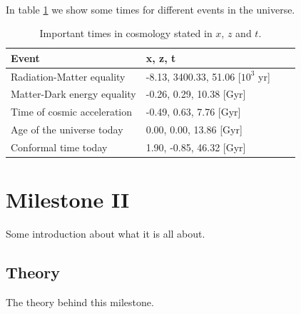 \documentclass{aa}
\begin{document}
\noindent
\\
In table \ref{tab:M1_times} we show some times for different events in the universe.
\begin{table}[h!] %
     \caption{Important times in cosmology stated in $x$, $z$ and $t$.} %
     \label{tab:M1_times}
     \begin{tabular}{l|l|r|l} %
       \textbf{Event} & \textbf{x, z, t}\\ %
       \hline %
       Radiation-Matter equality & -8.13,  3400.33, 51.06 [$10^3$ yr] \\
       Matter-Dark energy equality & -0.26, 0.29, 10.38 [Gyr]        \\
       Time of cosmic acceleration & -0.49, 0.63, 7.76 [Gyr]\\
       Age of the universe today & 0.00, 0.00, 13.86 [Gyr]  \\
       Conformal time today  & 1.90, -0.85, 46.32 [Gyr]\\

       \hline
     \end{tabular}
 \end{table}



\section{Milestone II}
Some introduction about what it is all about.

\subsection{Theory}
The theory behind this milestone.
\end{document}
